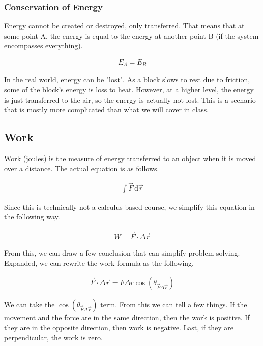\documentclass{article}
\begin{document}
\subsubsection{Conservation of Energy}
Energy cannot be created or destroyed, only transferred. That means
that at some point A, the energy is equal to the energy at another
point B (if the system encompasses everything).

\begin{eqnarray} \nonumber
    E_A = E_B
\end{eqnarray}

\noindent In the real world, energy can be "lost". As a block slows
to rest due to friction, some of the block's energy is loss to heat.
However, at a higher level, the energy is just transferred to the air,
so the energy is actually not lost. This is a scenario that is mostly
more complicated than what we will cover in class.


\subsection{Work}
Work (joules) is the measure of energy transferred to an object when it is 
moved over a distance. The actual equation is as follows.

\begin{eqnarray} \label{eq : true work}
    \int \vec{F} \, \text{d}\vec{r}
\end{eqnarray}

\noindent Since this is technically not a calculus based course, we simplify
this equation in the following way.

\begin{eqnarray} \label{eq : work}
    W = \vec{F} \cdot \Delta \vec{r}
\end{eqnarray}

\noindent From this, we can draw a few conclusion that can simplify 
problem-solving. Expanded, we can rewrite the work formula as the
following.

\begin{eqnarray} \nonumber
    \vec{F} \cdot \Delta \vec{r} = F \Delta r \cos(\theta_{\vec{F} \Delta \vec{r}})
\end{eqnarray}

\noindent We can take the $\cos(\theta_{\vec{F} \Delta \vec{r}})$ term. From this we
can tell a few things. If the movement and the force are in the same
direction, then the work is positive. If they are in the opposite
direction, then work is negative. Last, if they are perpendicular,
the work is zero.
\end{document}
